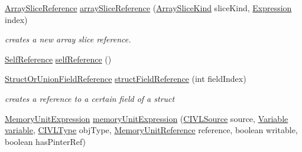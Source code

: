 \begin{DoxyCompactItemize}
\item 
\hyperlink{interfaceedu_1_1udel_1_1cis_1_1vsl_1_1civl_1_1model_1_1IF_1_1expression_1_1reference_1_1ArraySliceReference}{Array\+Slice\+Reference} \hyperlink{classedu_1_1udel_1_1cis_1_1vsl_1_1civl_1_1model_1_1common_1_1CommonModelFactory_adc15df4637529b40428a51e59ba7368a}{array\+Slice\+Reference} (\hyperlink{enumedu_1_1udel_1_1cis_1_1vsl_1_1civl_1_1model_1_1IF_1_1expression_1_1reference_1_1ArraySliceReference_1_1ArraySliceKind}{Array\+Slice\+Kind} slice\+Kind, \hyperlink{interfaceedu_1_1udel_1_1cis_1_1vsl_1_1civl_1_1model_1_1IF_1_1expression_1_1Expression}{Expression} index)
\begin{DoxyCompactList}\small\item\em creates a new array slice reference. \end{DoxyCompactList}\item 
\hyperlink{interfaceedu_1_1udel_1_1cis_1_1vsl_1_1civl_1_1model_1_1IF_1_1expression_1_1reference_1_1SelfReference}{Self\+Reference} \hyperlink{classedu_1_1udel_1_1cis_1_1vsl_1_1civl_1_1model_1_1common_1_1CommonModelFactory_ac0729b3d323c2b12cbfdb8438cdc2028}{self\+Reference} ()
\item 
\hyperlink{interfaceedu_1_1udel_1_1cis_1_1vsl_1_1civl_1_1model_1_1IF_1_1expression_1_1reference_1_1StructOrUnionFieldReference}{Struct\+Or\+Union\+Field\+Reference} \hyperlink{classedu_1_1udel_1_1cis_1_1vsl_1_1civl_1_1model_1_1common_1_1CommonModelFactory_a42f871991a2278b75406724c1c3cc039}{struct\+Field\+Reference} (int field\+Index)
\begin{DoxyCompactList}\small\item\em creates a reference to a certain field of a struct \end{DoxyCompactList}\item 
\hyperlink{interfaceedu_1_1udel_1_1cis_1_1vsl_1_1civl_1_1model_1_1IF_1_1expression_1_1MemoryUnitExpression}{Memory\+Unit\+Expression} \hyperlink{classedu_1_1udel_1_1cis_1_1vsl_1_1civl_1_1model_1_1common_1_1CommonModelFactory_a82be4364b71eeabf8dc92723d9ecc5e8}{memory\+Unit\+Expression} (\hyperlink{interfaceedu_1_1udel_1_1cis_1_1vsl_1_1civl_1_1model_1_1IF_1_1CIVLSource}{C\+I\+V\+L\+Source} source, \hyperlink{interfaceedu_1_1udel_1_1cis_1_1vsl_1_1civl_1_1model_1_1IF_1_1variable_1_1Variable}{Variable} \hyperlink{classedu_1_1udel_1_1cis_1_1vsl_1_1civl_1_1model_1_1common_1_1CommonModelFactory_afda3078a15e9df171117357e42739ea3}{variable}, \hyperlink{interfaceedu_1_1udel_1_1cis_1_1vsl_1_1civl_1_1model_1_1IF_1_1type_1_1CIVLType}{C\+I\+V\+L\+Type} obj\+Type, \hyperlink{interfaceedu_1_1udel_1_1cis_1_1vsl_1_1civl_1_1model_1_1IF_1_1expression_1_1reference_1_1MemoryUnitReference}{Memory\+Unit\+Reference} reference, boolean writable, boolean has\+Pinter\+Ref)

\end{DoxyCompactItemize}
